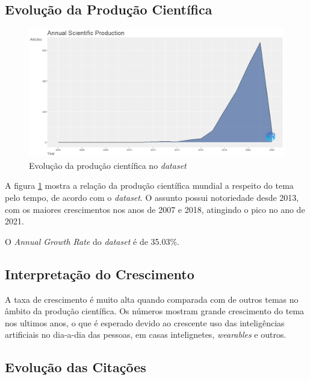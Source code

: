\subsection{Evolução da Produção Científica}

\begin{figure}
    \centering
    \includegraphics[width=1\textwidth]{experiments/CaioMassucato/PesquisaBibliometrica/DeepLearningHC/AnnualScientificProduction-2022-02-10.png}
    \caption{Evolução da produção científica no \textit{dataset}}
    \label{fig:evol:anual:DEEPLEARNINGHC@CaioMassucato}
\end{figure}

A figura \ref{fig:evol:anual:DEEPLEARNINGHC@CaioMassucato} mostra a relação da produção científica mundial a respeito do tema pelo tempo, de acordo com o \textit{dataset}. O assunto possui notoriedade desde 2013, com os maiores crescimentos nos anos de 2007 e 2018, atingindo o pico no ano de 2021. 

O \textit{Annual Growth Rate} do \textit{dataset} é de 35.03\%.

\subsection{Interpretação do Crescimento} A taxa de crescimento é muito alta quando comparada com de outros temas no âmbito da produção científica. Os números mostram grande crescimento do tema nos ultimos anos, o que é esperado devido ao crescente uso das inteligências artificiais no dia-a-dia das pessoas, em casas intelignetes, \textit{wearables} e outros.

\subsection{Evolução das Citações}

